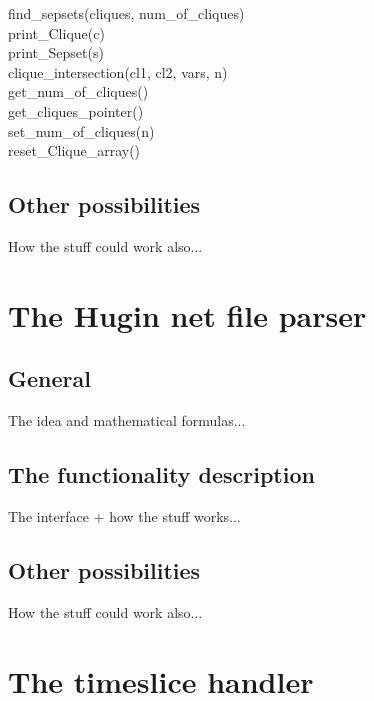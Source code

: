 \documentclass[12pt,a4paper]{report}
\begin{document}
\begin{description}
\item[find\_sepsets(cliques, num\_of\_cliques)]

\item[print\_Clique(c)]

\item[print\_Sepset(s)]

\item[clique\_intersection(cl1, cl2, vars, n)]

\item[get\_num\_of\_cliques()]

\item[get\_cliques\_pointer()]

\item[set\_num\_of\_cliques(n)]

\item[reset\_Clique\_array()]

\end{description}


\subsection{Other possibilities}

How the stuff could work also...


\newpage
\section{The Hugin net file parser}
\subsection{General}

The idea and mathematical formulas...

\subsection{The functionality description}

The interface + how the stuff works...

\subsection{Other possibilities}

How the stuff could work also...


\newpage
\section{The timeslice handler} %
\end{document}
